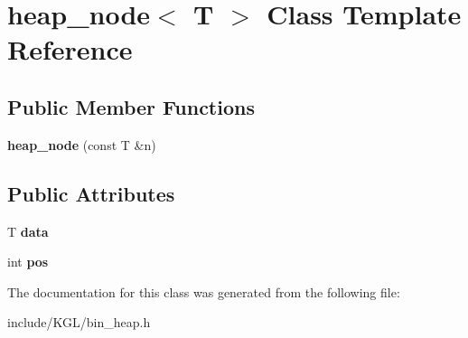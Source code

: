 \hypertarget{classheap__node}{}\section{heap\+\_\+node$<$ T $>$ Class Template Reference}
\label{classheap__node}
\subsection*{Public Member Functions}
\begin{DoxyCompactItemize}
\item 
\mbox{\label{classheap__node_a5f7209d13a6e95fe84770ea15c6a77b1}} 
{\bfseries heap\+\_\+node} (const T \&n)
\end{DoxyCompactItemize}
\subsection*{Public Attributes}
\begin{DoxyCompactItemize}
\item 
\mbox{\label{classheap__node_ae37815e49df4d367e28ca4615b40e397}} 
T {\bfseries data}
\item 
\mbox{\label{classheap__node_a6d6ebca320ede4a2dc3749caf0519534}} 
int {\bfseries pos}
\end{DoxyCompactItemize}


The documentation for this class was generated from the following file\+:\begin{DoxyCompactItemize}
\item 
include/\+K\+G\+L/bin\+\_\+heap.\+h\end{DoxyCompactItemize}
